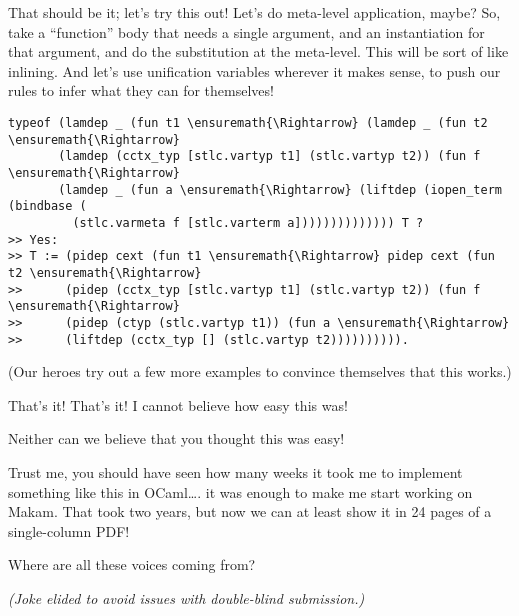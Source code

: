 \heroADVISOR{} That should be it; let's try this out! Let's do meta-level
application, maybe? So, take a ``function'' body that needs a single
argument, and an instantiation for that argument, and do the
substitution at the meta-level. This will be sort of like inlining. And
let's use unification variables wherever it makes sense, to push our
rules to infer what they can for themselves!

\begin{verbatim}
typeof (lamdep _ (fun t1 \ensuremath{\Rightarrow} (lamdep _ (fun t2 \ensuremath{\Rightarrow}
       (lamdep (cctx_typ [stlc.vartyp t1] (stlc.vartyp t2)) (fun f \ensuremath{\Rightarrow}
       (lamdep _ (fun a \ensuremath{\Rightarrow} (liftdep (iopen_term (bindbase (
         (stlc.varmeta f [stlc.varterm a]))))))))))))) T ?
>> Yes:
>> T := (pidep cext (fun t1 \ensuremath{\Rightarrow} pidep cext (fun t2 \ensuremath{\Rightarrow}
>>      (pidep (cctx_typ [stlc.vartyp t1] (stlc.vartyp t2)) (fun f \ensuremath{\Rightarrow}
>>      (pidep (ctyp (stlc.vartyp t1)) (fun a \ensuremath{\Rightarrow}
>>      (liftdep (cctx_typ [] (stlc.vartyp t2)))))))))).
\end{verbatim}

\begin{scenecomment}
(Our heroes try out a few more examples to convince themselves that this works.)
\end{scenecomment}

\heroSTUDENT{} That's it! That's it! I cannot believe how easy this was!

\heroAUDIENCE{} Neither can we believe that you thought this was easy!

\heroAUTHOR{} Trust me, you should have seen how many weeks it took me to
implement something like this in OCaml\ldots{}. it was enough to make me
start working on Makam. That took two years, but now we can at least
show it in 24 pages of a single-column PDF!

\heroADVISOR{} Where are all these voices coming from?

\heroSTUDENT{}
\textit{(Joke elided to avoid issues with double-blind submission.)}
